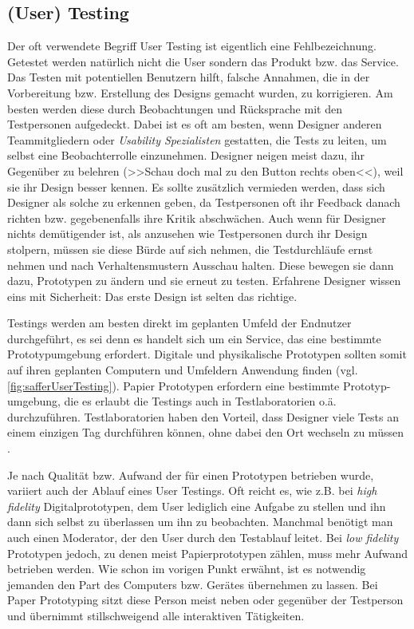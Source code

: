 \subsection{(User) Testing}  
Der oft verwendete Begriff User Testing ist eigentlich eine Fehlbezeichnung. Getestet werden natürlich nicht die User sondern das Produkt bzw. das Service. 
Das Testen mit potentiellen Benutzern hilft, falsche Annahmen, die in der Vorbereitung bzw. Erstellung des Designs gemacht wurden, zu korrigieren. Am besten werden diese durch Beobachtungen und Rücksprache mit den Testpersonen aufgedeckt. Dabei ist es oft am besten, wenn Designer anderen Teammitgliedern oder \emph{Usability Spezialisten} gestatten, die Tests zu leiten, um selbst eine Beobachterrolle einzunehmen. Designer neigen meist dazu, ihr Gegenüber zu belehren (>>Schau doch mal zu den Button rechts oben<<), weil sie ihr Design besser kennen. Es sollte zusätzlich vermieden werden, dass sich Designer als solche zu erkennen geben, da Testpersonen oft ihr Feedback danach richten bzw. gegebenenfalls ihre Kritik abschwächen. Auch wenn für Designer nichts demütigender ist, als anzusehen wie Testpersonen durch ihr Design stolpern, müssen sie diese Bürde auf sich nehmen, die Testdurchläufe ernst nehmen und nach Verhaltensmustern Ausschau halten.  Diese bewegen sie dann dazu, Prototypen zu ändern und sie erneut zu testen. Erfahrene Designer wissen eins mit Sicherheit: Das erste Design ist selten das richtige.

Testings werden am besten direkt im geplanten Umfeld der Endnutzer durchgeführt, es sei denn es handelt sich um ein Service, das eine bestimmte Prototypumgebung erfordert. Digitale und physikalische Prototypen sollten somit auf ihren geplanten Computern und Umfeldern Anwendung finden (vgl. \autoref{fig:safferUserTesting}). Papier Prototypen erfordern eine bestimmte Prototyp-umgebung, die es erlaubt die Testings auch in Testlaboratorien o.ä. durchzuführen. Testlaboratorien haben den Vorteil, dass Designer viele Tests an einem einzigen Tag durchführen können, ohne dabei den Ort wechseln zu müssen \citep{Saffer:2007}.

\medskip Je nach Qualität bzw. Aufwand der für einen Prototypen betrieben wurde, variiert auch der Ablauf eines User Testings. Oft reicht es, wie z.B. bei \emph{high fidelity} Digitalprototypen, dem User lediglich eine Aufgabe zu stellen und ihn dann sich selbst zu überlassen um ihn zu beobachten. Manchmal benötigt man auch einen Moderator, der den User durch den Testablauf leitet. Bei \emph{low fidelity} Prototypen jedoch, zu denen meist Papierprototypen zählen, muss mehr Aufwand betrieben werden. Wie schon im vorigen Punkt erwähnt, ist es notwendig jemanden den Part des Computers bzw. Gerätes übernehmen zu lassen. Bei Paper Prototyping sitzt diese Person meist neben oder gegenüber der Testperson und übernimmt stillschweigend alle interaktiven Tätigkeiten.

